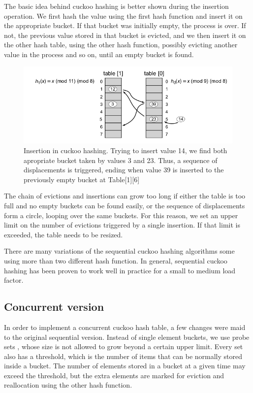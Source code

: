 The basic idea behind cuckoo hashing is better shown during the insertion operation. We first hash the value using the first hash function and insert it on the appropriate bucket. If that bucket was initially empty, the process is over. If not, the previous value stored in that bucket is evicted, and we then insert it  on the other hash table, using the other hash function, possibly evicting another value in the process and so on, until an empty bucket is found.

\begin{figure}
 \centering
  \includegraphics[scale=0.5]{cuckoo_hashing.png}
\caption{Insertion in cuckoo hashing. Trying to insert value 14, we find both apropriate bucket taken by values 3 and 23. Thus, a sequence of displacements is triggered, ending when value 39 is inserted to the previously empty bucket at Table[1][6] }
\end{figure}

The chain of evictions and insertions can grow too long if either the table is too full and no empty buckets can be found easily, or the sequence of displacements form a circle, looping over the same buckets. For this reason, we set an upper limit on the number of evictions triggered by a single insertion. If that limit is exceeded, the table needs to be resized.

There are many variations of the sequential cuckoo hashing algorithms some using more than two different hash function. In general, sequential cuckoo hashing has been proven to work well in practice for a small  to medium load factor.

\subsection{Concurrent version}

In order to implement a concurrent cuckoo hash table, a few changes were maid to the original sequential version. Instead of single element buckets, we use probe sets , whose size is not allowed to grow beyond a certain upper limit. Every set also has a threshold, which is the number of items that can be normally stored inside a bucket. The number of elements stored in a bucket at a given time may exceed the threshold, but the extra elements are marked for eviction and reallocation using the other hash function.

